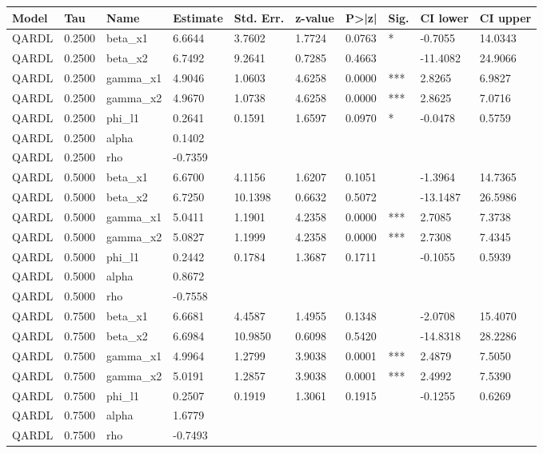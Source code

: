 \begin{tabular}{llllllllll}
\hline
Model & Tau & Name & Estimate & Std. Err. & z-value & P>|z| & Sig. & CI lower & CI upper \\
\hline
QARDL & 0.2500 & beta\_x1 & 6.6644 & 3.7602 & 1.7724 & 0.0763 & * & -0.7055 & 14.0343 \\
QARDL & 0.2500 & beta\_x2 & 6.7492 & 9.2641 & 0.7285 & 0.4663 &  & -11.4082 & 24.9066 \\
QARDL & 0.2500 & gamma\_x1 & 4.9046 & 1.0603 & 4.6258 & 0.0000 & *** & 2.8265 & 6.9827 \\
QARDL & 0.2500 & gamma\_x2 & 4.9670 & 1.0738 & 4.6258 & 0.0000 & *** & 2.8625 & 7.0716 \\
QARDL & 0.2500 & phi\_l1 & 0.2641 & 0.1591 & 1.6597 & 0.0970 & * & -0.0478 & 0.5759 \\
QARDL & 0.2500 & alpha & 0.1402 &  &  &  &  &  &  \\
QARDL & 0.2500 & rho & -0.7359 &  &  &  &  &  &  \\
QARDL & 0.5000 & beta\_x1 & 6.6700 & 4.1156 & 1.6207 & 0.1051 &  & -1.3964 & 14.7365 \\
QARDL & 0.5000 & beta\_x2 & 6.7250 & 10.1398 & 0.6632 & 0.5072 &  & -13.1487 & 26.5986 \\
QARDL & 0.5000 & gamma\_x1 & 5.0411 & 1.1901 & 4.2358 & 0.0000 & *** & 2.7085 & 7.3738 \\
QARDL & 0.5000 & gamma\_x2 & 5.0827 & 1.1999 & 4.2358 & 0.0000 & *** & 2.7308 & 7.4345 \\
QARDL & 0.5000 & phi\_l1 & 0.2442 & 0.1784 & 1.3687 & 0.1711 &  & -0.1055 & 0.5939 \\
QARDL & 0.5000 & alpha & 0.8672 &  &  &  &  &  &  \\
QARDL & 0.5000 & rho & -0.7558 &  &  &  &  &  &  \\
QARDL & 0.7500 & beta\_x1 & 6.6681 & 4.4587 & 1.4955 & 0.1348 &  & -2.0708 & 15.4070 \\
QARDL & 0.7500 & beta\_x2 & 6.6984 & 10.9850 & 0.6098 & 0.5420 &  & -14.8318 & 28.2286 \\
QARDL & 0.7500 & gamma\_x1 & 4.9964 & 1.2799 & 3.9038 & 0.0001 & *** & 2.4879 & 7.5050 \\
QARDL & 0.7500 & gamma\_x2 & 5.0191 & 1.2857 & 3.9038 & 0.0001 & *** & 2.4992 & 7.5390 \\
QARDL & 0.7500 & phi\_l1 & 0.2507 & 0.1919 & 1.3061 & 0.1915 &  & -0.1255 & 0.6269 \\
QARDL & 0.7500 & alpha & 1.6779 &  &  &  &  &  &  \\
QARDL & 0.7500 & rho & -0.7493 &  &  &  &  &  &  \\
\hline
\end{tabular}
